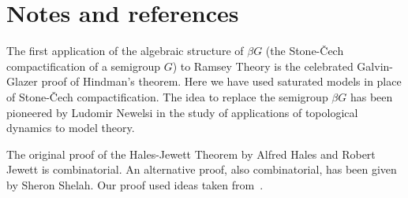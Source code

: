 \documentclass[creche.tex]{subfiles}
\begin{document}
\section{Notes and references}

The first application of the algebraic structure of $\beta G$ 
(the Stone-\v{C}ech compactification of a semigroup $G$) 
to Ramsey Theory is the celebrated Galvin-Glazer proof of Hindman's theorem. 
Here we have used saturated models in place of Stone-\v{C}ech compactification.
The idea to replace the semigroup $\beta G$  has been pioneered by Ludomir Newelsi
in the study of applications of topological dynamics to model theory. 

The original proof of the Hales-Jewett Theorem by Alfred Hales and Robert Jewett is combinatorial.
An alternative proof, also combinatorial, has been given by Sheron Shelah.
Our proof used ideas taken from~\cite{CZ}.
\end{document}
